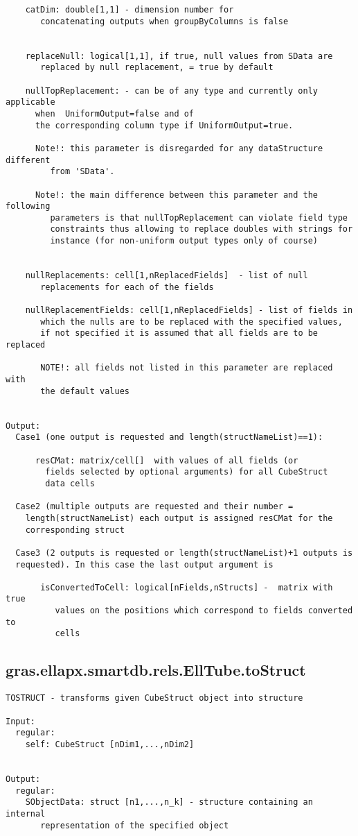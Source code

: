 \begin{verbatim}
    catDim: double[1,1] - dimension number for
       concatenating outputs when groupByColumns is false


    replaceNull: logical[1,1], if true, null values from SData are
       replaced by null replacement, = true by default

    nullTopReplacement: - can be of any type and currently only applicable
      when  UniformOutput=false and of
      the corresponding column type if UniformOutput=true.

      Note!: this parameter is disregarded for any dataStructure different
         from 'SData'.

      Note!: the main difference between this parameter and the following
         parameters is that nullTopReplacement can violate field type
         constraints thus allowing to replace doubles with strings for
         instance (for non-uniform output types only of course)


    nullReplacements: cell[1,nReplacedFields]  - list of null
       replacements for each of the fields

    nullReplacementFields: cell[1,nReplacedFields] - list of fields in
       which the nulls are to be replaced with the specified values,
       if not specified it is assumed that all fields are to be replaced

       NOTE!: all fields not listed in this parameter are replaced with
       the default values


Output:
  Case1 (one output is requested and length(structNameList)==1):

      resCMat: matrix/cell[]  with values of all fields (or
        fields selected by optional arguments) for all CubeStruct
        data cells

  Case2 (multiple outputs are requested and their number =
    length(structNameList) each output is assigned resCMat for the
    corresponding struct

  Case3 (2 outputs is requested or length(structNameList)+1 outputs is
  requested). In this case the last output argument is

       isConvertedToCell: logical[nFields,nStructs] -  matrix with true
          values on the positions which correspond to fields converted to
          cells
\end{verbatim}
\subsection{\texorpdfstring{gras.ellapx.smartdb.rels.EllTube.toStruct}{toStruct}}\label{method:gras.ellapx.smartdb.rels.EllTube.toStruct}
\begin{verbatim}
TOSTRUCT - transforms given CubeStruct object into structure

Input:
  regular:
    self: CubeStruct [nDim1,...,nDim2]


Output:
  regular:
    SObjectData: struct [n1,...,n_k] - structure containing an internal
       representation of the specified object
\end{verbatim}
